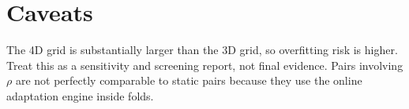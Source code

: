 \documentclass[10pt]{article}
\begin{document}
\section*{Caveats}
The 4D grid is substantially larger than the 3D grid, so overfitting risk is
higher. Treat this as a sensitivity and screening report, not final evidence.
Pairs involving $\rho$ are not perfectly comparable to static pairs because
they use the online adaptation engine inside folds.
\end{document}
